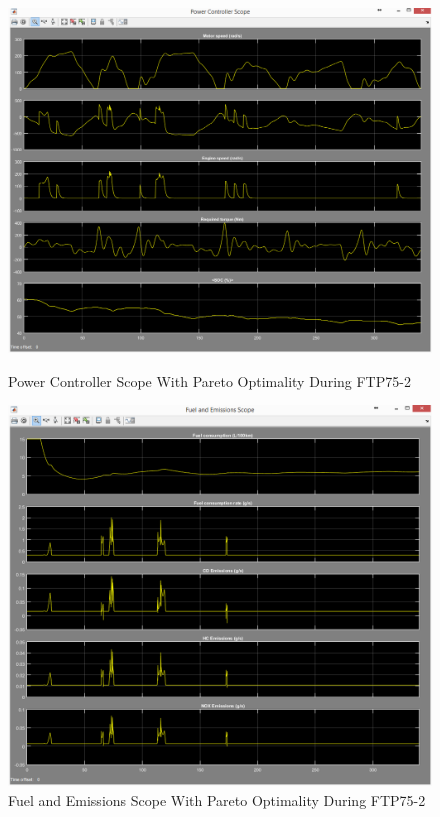 \begin{figure}[hp]
\centering
\includegraphics[scale=0.45]{figures/Pareto/FTP75-2/powerController03Juli}
\caption{Power Controller Scope With Pareto Optimality During FTP75-2}
\label{fig:pcpo2}
\includegraphics[scale=0.48]{figures/Pareto/FTP75-2/fuelEmissions03Juli}
\caption{Fuel and Emissions Scope With Pareto Optimality During FTP75-2}
\label{fig:fepo2}
\end{figure}

